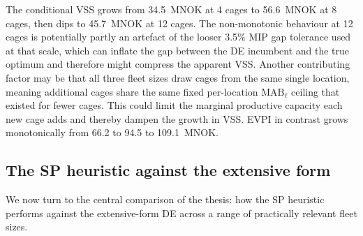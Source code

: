 \documentclass[12pt,a4paper]{article}
\begin{document}
The conditional VSS grows from 34.5~MNOK at 4 cages to 56.6~MNOK at 8
cages, then dips to 45.7~MNOK at 12 cages. The non-monotonic behaviour
at 12 cages is potentially partly an artefact of the looser 3.5\% MIP
gap tolerance used at that scale, which can inflate the gap between the
DE incumbent and the true optimum and therefore might compress the
apparent VSS. Another contributing factor may be that all three fleet
sizes draw cages from the same single location, meaning additional cages
share the same fixed per-location $\mathrm{MAB}_\ell$ ceiling that existed for fewer cages. This could limit the marginal productive capacity each
new cage adds and thereby dampen the growth in VSS. EVPI in contrast
grows monotonically from 66.2 to 94.5 to 109.1~MNOK. 

\subsection{The SP heuristic against the extensive form}
\label{sec:sp_vs_ef}

We now turn to the central comparison of the thesis: how the SP heuristic
performs against the extensive-form DE across a range of practically
relevant fleet sizes.
\end{document}
